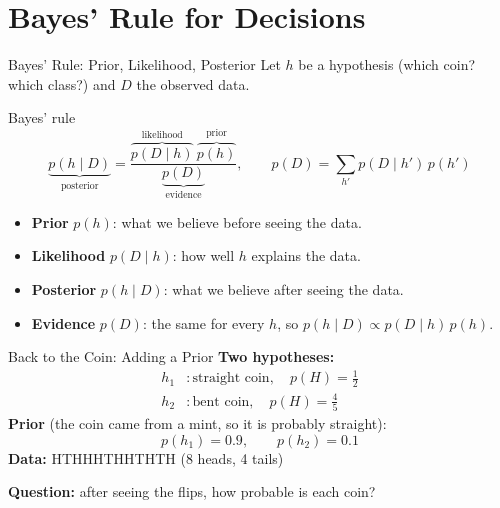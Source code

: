 \documentclass[aspectratio=169]{beamer}
\begin{document}
\section{Bayes' Rule for Decisions}

\begin{frame}{Bayes' Rule: Prior, Likelihood, Posterior}
Let $h$ be a hypothesis (which coin? which class?) and $D$ the observed data.
\begin{block}{Bayes' rule}
\[
  \underbrace{p(h\mid D)}_{\text{posterior}}
  = \frac{\overbrace{p(D\mid h)}^{\text{likelihood}}\ \overbrace{p(h)}^{\text{prior}}}{\underbrace{p(D)}_{\text{evidence}}},
  \qquad
  p(D) = \sum_{h'} p(D\mid h')\,p(h')
\]
\end{block}
\begin{itemize}
  \item \textbf{Prior} $p(h)$: what we believe before seeing the data.
  \item \textbf{Likelihood} $p(D\mid h)$: how well $h$ explains the data.
  \item \textbf{Posterior} $p(h\mid D)$: what we believe after seeing the data.
  \item \textbf{Evidence} $p(D)$: the same for every $h$, so $p(h\mid D) \propto p(D\mid h)\,p(h)$.
\end{itemize}
\end{frame}

\begin{frame}{Back to the Coin: Adding a Prior}
\textbf{Two hypotheses:}
\begin{align*}
  h_1 &: \text{straight coin}, \quad p(H)=\tfrac{1}{2} \\
  h_2 &: \text{bent coin}, \quad p(H)=\tfrac{4}{5}
\end{align*}
\textbf{Prior} (the coin came from a mint, so it is probably straight):
\[
  p(h_1) = 0.9, \qquad p(h_2) = 0.1
\]
\textbf{Data:} HTHHHTHHTHTH (8 heads, 4 tails)

\vspace{0.3cm}
\textbf{Question:} after seeing the flips, how probable is each coin?
\end{frame}
\end{document}
